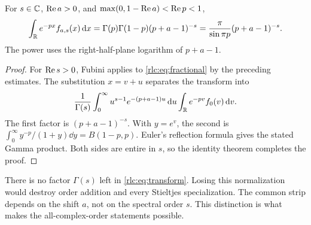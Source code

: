 \begin{theorem}\label{rlc:thm:transform}
For $s\in\mathbb C$, $\operatorname{Re} a>0$, and
$\max(0,1-\operatorname{Re} a)<\operatorname{Re} p<1$,
\begin{equation}\label{rlc:eq:transform}
 \int_\mathbb R e^{-px}f_{a,s}(x)\,\mathrm d x
 =\Gamma(p)\Gamma(1-p)(p+a-1)^{-s}
 =\frac{\pi}{\sin\pi p}(p+a-1)^{-s}.
\end{equation}
The power uses the right-half-plane logarithm of $p+a-1$.
\end{theorem}
\begin{proof}
For $\operatorname{Re} s>0$, Fubini applies to \eqref{rlc:eq:fractional} by the
preceding estimates. The substitution $x=v+u$ separates the transform
into
\[
 \frac1{\Gamma(s)}\int_0^\infty
 u^{s-1}e^{-(p+a-1)u}\,\mathrm d u
 \int_\mathbb R e^{-pv}f_0(v)\,\mathrm d v.
\]
The first factor is $(p+a-1)^{-s}$. With $y=e^v$, the second is
$\int_0^\infty y^{-p}/(1+y)\dd y=B(1-p,p)$.
Euler's reflection formula gives the stated Gamma product. Both sides
are entire in $s$, so the identity theorem completes the proof.
\end{proof}

There is no factor $\Gamma(s)$ left in \eqref{rlc:eq:transform}.
Losing this normalization would destroy order addition and every
Stieltjes specialization. The common strip depends on the shift $a$,
not on the spectral order $s$. This distinction is what makes the
all-complex-order statements possible.
